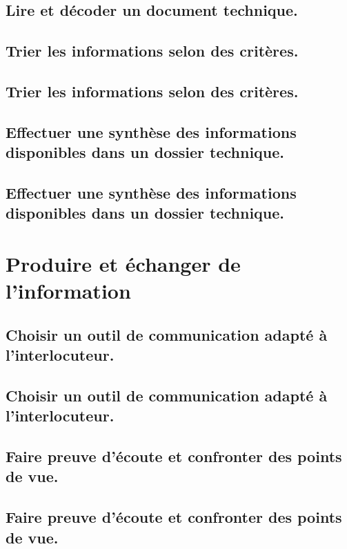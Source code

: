 \documentclass[10pt,fleqn]{book}
\begin{document}
\subsection{Lire et décoder un document technique.} 

\subsection{Trier les informations selon des critères.} 

\subsection{Trier les informations selon des critères.} 

\subsection{Effectuer une synthèse des informations disponibles dans un dossier technique.} 

\subsection{Effectuer une synthèse des informations disponibles dans un dossier technique.} 

\section{Produire et échanger de l'information} 

\subsection{Choisir un outil de communication adapté à l’interlocuteur.} 

\subsection{Choisir un outil de communication adapté à l’interlocuteur.} 

\subsection{Faire preuve d’écoute et confronter des points de vue.} 

\subsection{Faire preuve d’écoute et confronter des points de vue.} 
\end{document}
